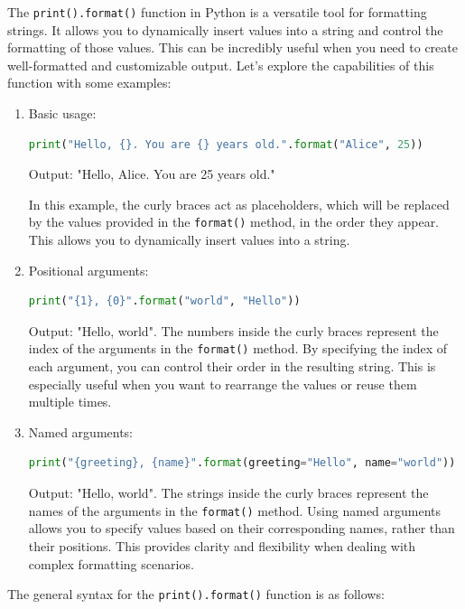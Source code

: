 \documentclass[12pt]{book}
\begin{document}
The \texttt{print().format()} function in Python is a versatile tool for formatting strings. It allows you to dynamically insert values into a string and control the formatting of those values. This can be incredibly useful when you need to create well-formatted and customizable output. Let's explore the capabilities of this function with some examples:

\begin{enumerate}
    \item Basic usage: \\
    \begin{lstlisting}[language=Python]
    print("Hello, {}. You are {} years old.".format("Alice", 25))
    \end{lstlisting}
    Output: "Hello, Alice. You are 25 years old." 
    
    In this example, the curly braces {} act as placeholders, which will be replaced by the values provided in the \texttt{format()} method, in the order they appear. This allows you to dynamically insert values into a string.

    \item Positional arguments: \\
    \begin{lstlisting}[language=Python]
    print("{1}, {0}".format("world", "Hello"))
    \end{lstlisting}
    Output: "Hello, world". The numbers inside the curly braces represent the index of the arguments in the \texttt{format()} method. By specifying the index of each argument, you can control their order in the resulting string. This is especially useful when you want to rearrange the values or reuse them multiple times.

    \item Named arguments: \\
    \begin{lstlisting}[language=Python]
    print("{greeting}, {name}".format(greeting="Hello", name="world"))
    \end{lstlisting}
    Output: "Hello, world". The strings inside the curly braces represent the names of the arguments in the \texttt{format()} method. Using named arguments allows you to specify values based on their corresponding names, rather than their positions. This provides clarity and flexibility when dealing with complex formatting scenarios.

\end{enumerate}

The general syntax for the \texttt{print().format()} function is as follows:
\end{document}
